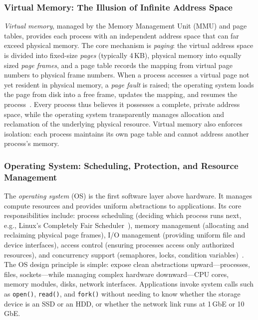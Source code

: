 \documentclass[11pt,a4paper]{article}
\begin{document}
\subsubsection{Virtual Memory: The Illusion of Infinite Address Space}

\textit{Virtual memory}, managed by the Memory Management Unit (MMU) and page tables, provides each process with an independent address space that can far exceed physical memory.
The core mechanism is \emph{paging}: the virtual address space is divided into fixed-size \emph{pages} (typically 4\,KB), physical memory into equally sized \emph{page frames}, and a page table records the mapping from virtual page numbers to physical frame numbers.
When a process accesses a virtual page not yet resident in physical memory, a \emph{page fault} is raised; the operating system loads the page from disk into a free frame, updates the mapping, and resumes the process~\cite{ostep_2023}.
Every process thus believes it possesses a complete, private address space, while the operating system transparently manages allocation and reclamation of the underlying physical resource.
Virtual memory also enforces isolation: each process maintains its own page table and cannot address another process's memory.

\subsubsection{Operating System: Scheduling, Protection, and Resource Management}

The \textit{operating system} (OS) is the first software layer above hardware.
It manages compute resources and provides uniform abstractions to applications.
Its core responsibilities include: process scheduling (deciding which process runs next, e.g., Linux's Completely Fair Scheduler~\cite{linux_cfs_2026}), memory management (allocating and reclaiming physical page frames), I/O management (providing uniform file and device interfaces), access control (ensuring processes access only authorized resources), and concurrency support (semaphores, locks, condition variables)~\cite{ostep_2023,xv6_2022}.
The OS design principle is simple: expose clean abstractions upward---processes, files, sockets---while managing complex hardware downward---CPU cores, memory modules, disks, network interfaces.
Applications invoke system calls such as \texttt{open()}, \texttt{read()}, and \texttt{fork()} without needing to know whether the storage device is an SSD or an HDD, or whether the network link runs at 1\,GbE or 10\,GbE.
\end{document}

